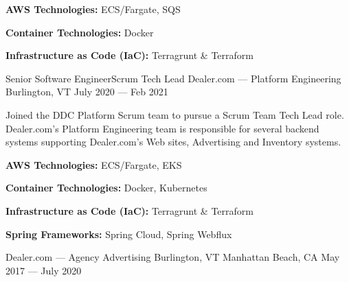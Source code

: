 \vspace{-2.00mm}
\begin{cventries}
    {} %
    {} %
    {} %
    {%
      \begin{cvitems} %
        \item {\textbf{AWS Technologies:} ECS/Fargate, SQS}
        \item {\textbf{Container Technologies:} Docker}
        \item {\textbf{Infrastructure as Code (IaC):} Terragrunt \& Terraform}
      \end{cvitems}
    }

  \cventry
    {Senior Software Engineer{\enskip\cdotp\enskip}Scrum Tech Lead} %
    {Dealer.com --- Platform Engineering} %
    {Burlington, VT} %
    {July 2020 --- Feb 2021} %
    {}
\end{cventries}
\vspace{-6.00mm}

\begin{cvparagraph}
Joined the DDC Platform Scrum team to pursue a Scrum Team Tech Lead role. Dealer.com's Platform Engineering team is responsible for several backend systems supporting Dealer.com's Web sites, Advertising and Inventory systems.
\end{cvparagraph}

\vspace{-2.00mm}
\begin{cventries}
    {} %
    {} %
    {} %
    {%
      \begin{cvitems} %
        \item {\textbf{AWS Technologies:} ECS/Fargate, EKS}
        \item {\textbf{Container Technologies:} Docker, Kubernetes}
        \item {\textbf{Infrastructure as Code (IaC):} Terragrunt \& Terraform}
        \item {\textbf{Spring Frameworks:} Spring Cloud, Spring Webflux}
      \end{cvitems}
    }


    {Dealer.com --- Agency Advertising} %
    {Burlington, VT \linebreak Manhattan Beach, CA} %
    {May 2017 --- July 2020} %
    {}
\end{cventries}
\vspace{-6.00mm}

